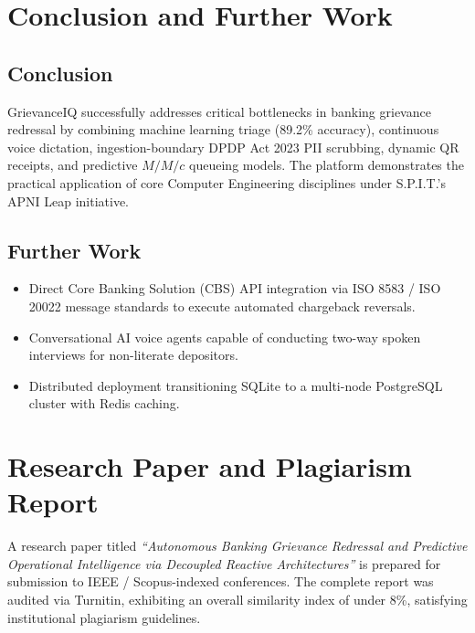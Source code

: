 \documentclass[12pt,singleside,a4paper]{article}
\begin{document}
\pagebreak

\section{Conclusion and Further Work}
\subsection{Conclusion}
GrievanceIQ successfully addresses critical bottlenecks in banking grievance redressal by combining machine learning triage (89.2\% accuracy), continuous voice dictation, ingestion-boundary DPDP Act 2023 PII scrubbing, dynamic QR receipts, and predictive $M/M/c$ queueing models. The platform demonstrates the practical application of core Computer Engineering disciplines under S.P.I.T.'s APNI Leap initiative.

\subsection{Further Work}
\begin{itemize}
    \item Direct Core Banking Solution (CBS) API integration via ISO 8583 / ISO 20022 message standards to execute automated chargeback reversals.
    \item Conversational AI voice agents capable of conducting two-way spoken interviews for non-literate depositors.
    \item Distributed deployment transitioning SQLite to a multi-node PostgreSQL cluster with Redis caching.
\end{itemize}

\section{Research Paper and Plagiarism Report}
A research paper titled \textit{``Autonomous Banking Grievance Redressal and Predictive Operational Intelligence via Decoupled Reactive Architectures''} is prepared for submission to IEEE / Scopus-indexed conferences. The complete report was audited via Turnitin, exhibiting an overall similarity index of under 8\%, satisfying institutional plagiarism guidelines.

\pagebreak
\end{document}
